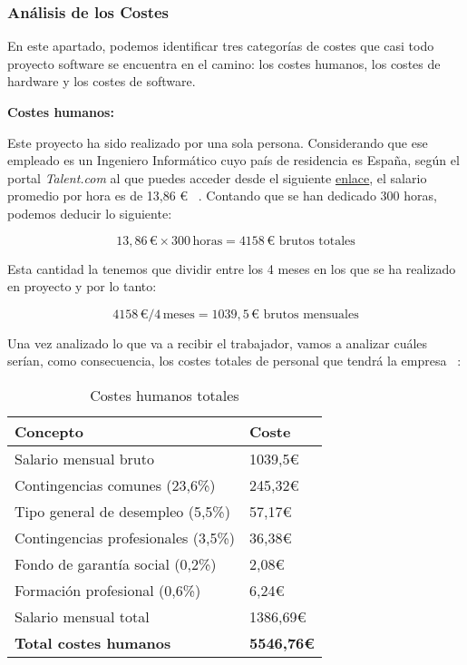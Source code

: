 \subsubsection{Análisis de los Costes}

En este apartado, podemos identificar tres categorías de costes que casi todo proyecto software se encuentra en el camino:  los costes humanos, los costes de hardware y los costes de software.

\textbf{Costes humanos:}

Este proyecto ha sido realizado por una sola persona. Considerando que ese empleado es un Ingeniero Informático cuyo país de residencia es España, según el portal \textit{Talent.com} al que puedes acceder desde el siguiente \href{https://es.talent.com/salary?job=ingeniero+inform%C3%A1tico}{enlace}, el salario promedio por hora es de 13,86 € ~\cite{salarioingeniero:latex}. Contando que se han dedicado 300 horas, podemos deducir lo siguiente:

\[ 13,86 \, \text{€} \times 300 \, \text{horas} = 4158 \, \text{€ brutos totales} \]

Esta cantidad la tenemos que dividir entre los 4 meses en los que se ha realizado en proyecto y por lo tanto:

\[ 4158 \, \text{€} / 4 \, \text{meses} = 1039,5 \, \text{€ brutos mensuales} \]

Una vez analizado lo que va a recibir el trabajador, vamos a analizar cuáles serían, como consecuencia, los costes totales de personal que tendrá la empresa ~\cite{costetrabajador:latex}:
 

\begin{table}[H]
    \centering
    \renewcommand{\arraystretch}{1.2}
    \setlength{\tabcolsep}{20pt}
    \begin{tabular}{l l}
        \hline
        \textbf{Concepto} & \textbf{Coste} \\ \hline
        Salario mensual bruto & 1039,5€ \\
        Contingencias comunes (23,6\%) & 245,32€\\
        Tipo general de  desempleo (5,5\%) & 57,17€\\
        Contingencias profesionales (3,5\%) & 36,38€\\
        Fondo de garantía social (0,2\%)& 2,08€\\
        Formación profesional (0,6\%) & 6,24€\\
        Salario mensual total & 1386,69€\\  \hline
        \textbf{Total costes humanos} & \textbf{5546,76€}\\ \hline
    \end{tabular}
    \caption{Costes humanos totales}
    \label{tab:costes_humanos}
\end{table}

